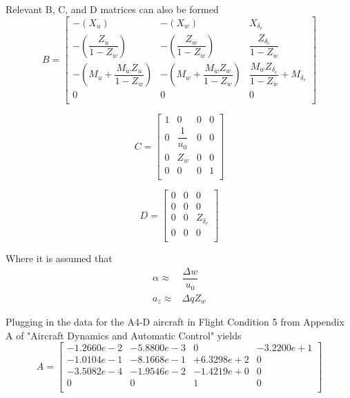 \documentclass[12pt]{article}
\begin{document}
\noindent Relevant B, C, and D matrices can also be formed
\begin{equation*}
B =
\begin{bmatrix}
   -(X_u)                                          & -(X_w)                                          & X_{\delta_e} \\
   -(\dfrac{Z_u}{1-Z_{\dot{w}}})                   & -(\dfrac{Z_w}{1-Z_{\dot{w}}})                   & \dfrac{Z_{\delta_e}}{1-Z_{\dot{w}}} \\
   -(M_u + \dfrac{M_{\dot{w}} Z_u}{1-Z_{\dot{w}}}) & -(M_w + \dfrac{M_{\dot{w}} Z_w}{1-Z_{\dot{w}}}) & \dfrac{M_{\dot{w}} Z_{\delta_e}}{1-Z_{\dot{w}}} + M_{\delta_e} \\
    0                                              &  0                                              & 0 \\
\end{bmatrix}
\end{equation*}

\begin{equation*}
C =
\begin{bmatrix}
    1 & 0     & 0 & 0 \\
    0 & \dfrac{1}{u_0} & 0 & 0 \\
    0 & Z_w   & 0 & 0 \\
    0 & 0     & 0 & 1 \\
\end{bmatrix}
\end{equation*}

\begin{equation*}
D =
\begin{bmatrix}
    0 & 0 & 0     \\
    0 & 0 & 0     \\
    0 & 0 & Z_{\delta_e} \\
    0 & 0 & 0     \\
\end{bmatrix}
\end{equation*}

\noindent Where it is assumed that
\begin{equation*}
\begin{split}
\alpha \approx & \dfrac{\Delta w}{u_0}\\
   a_z \approx & \Delta q Z_w
\end{split}
\end{equation*}

\newpage
\noindent Plugging in the data for the A4-D aircraft in Flight Condition 5 from Appendix A of "Aircraft Dynamics and Automatic Control" yields
\begin{equation*}
A =
\begin{bmatrix}
  -1.2660e-2 & -5.8800e-3 &          0 & -3.2200e+1 \\
  -1.0104e-1 & -8.1668e-1 & +6.3298e+2 &          0 \\
  -3.5082e-4 & -1.9546e-2 & -1.4219e+0 &          0 \\
          0 &           0 & 1 &          0 \\
\end{bmatrix}
\end{equation*}
\end{document}
